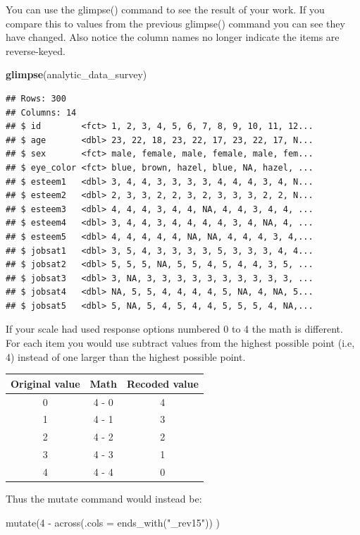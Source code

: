 \documentclass[
]{krantz}
\makeatletter
\newenvironment{Shaded}{\begin{snugshade}}{\end{snugshade}}
\newcommand{\KeywordTok}[1]{\textcolor[rgb]{0.27,0.27,0.27}{\textbf{#1}}}
\newcommand{\NormalTok}[1]{#1}
\newenvironment{kframe}{%
\medskip{}
\setlength{\fboxsep}{.8em}
 \def\at@end@of@kframe{}%
 \ifinner\ifhmode%
  \def\at@end@of@kframe{\end{minipage}}%
  \begin{minipage}{\columnwidth}%
 \fi\fi%
 \def\FrameCommand##1{\hskip\@totalleftmargin \hskip-\fboxsep
 \colorbox{shadecolor}{##1}\hskip-\fboxsep
     \hskip-\linewidth \hskip-\@totalleftmargin \hskip\columnwidth}%
 \MakeFramed {\advance\hsize-\width
   \@totalleftmargin\z@ \linewidth\hsize
   \@setminipage}}%
 {\par\unskip\endMakeFramed%
 \at@end@of@kframe}
\newenvironment{rmdblock}[1]
  {
  \begin{itemize}
  \renewcommand{\labelitemi}{
    \raisebox{-.7\height}[0pt][0pt]{
      {\setkeys{Gin}{width=3em,keepaspectratio}\texttt{[image: images/\#1]}}
    }
  }
  \setlength{\fboxsep}{1em}
  \begin{kframe}
  \item
  }
  {
  \end{kframe}
  \end{itemize}
  }
\newenvironment{rmdcaution}
  {\begin{rmdblock}{caution}}
  {\end{rmdblock}}
\renewenvironment{Shaded}{\begin{kframe}}{\end{kframe}}
\makeatother
\begin{document}
You can use the glimpse() command to see the result of your work. If you compare this to values from the previous glimpse() command you can see they have changed. Also notice the column names no longer indicate the items are reverse-keyed.

\begin{Shaded}
\begin{Highlighting}[]
\KeywordTok{glimpse}\NormalTok{(analytic_data_survey)}
\end{Highlighting}
\end{Shaded}

\begin{verbatim}
## Rows: 300
## Columns: 14
## $ id        <fct> 1, 2, 3, 4, 5, 6, 7, 8, 9, 10, 11, 12...
## $ age       <dbl> 23, 22, 18, 23, 22, 17, 23, 22, 17, N...
## $ sex       <fct> male, female, male, female, male, fem...
## $ eye_color <fct> blue, brown, hazel, blue, NA, hazel, ...
## $ esteem1   <dbl> 3, 4, 4, 3, 3, 3, 3, 4, 4, 4, 3, 4, N...
## $ esteem2   <dbl> 2, 3, 3, 2, 2, 3, 2, 3, 3, 3, 2, 2, N...
## $ esteem3   <dbl> 4, 4, 4, 3, 4, 4, NA, 4, 4, 3, 4, 4, ...
## $ esteem4   <dbl> 3, 4, 4, 3, 4, 4, 4, 4, 3, 4, NA, 4, ...
## $ esteem5   <dbl> 4, 4, 4, 4, 4, NA, NA, 4, 4, 4, 3, 4,...
## $ jobsat1   <dbl> 3, 5, 4, 3, 3, 3, 3, 5, 3, 3, 3, 4, 4...
## $ jobsat2   <dbl> 5, 5, 5, NA, 5, 5, 4, 5, 4, 4, 3, 5, ...
## $ jobsat3   <dbl> 3, NA, 3, 3, 3, 3, 3, 3, 3, 3, 3, 3, ...
## $ jobsat4   <dbl> NA, 5, 5, 4, 4, 4, 4, 5, NA, 4, NA, 5...
## $ jobsat5   <dbl> 5, NA, 5, 4, 5, 4, 4, 5, 5, 5, 4, NA,...
\end{verbatim}

\begin{rmdcaution}
\begin{rmdcaution}

If your scale had used response options numbered 0 to 4 the math is different.
For each item you would use subtract values from the highest possible point (i.e, 4) instead of one larger than the highest possible point.

\begin{longtable}[]{@{}ccc@{}}
\toprule
Original value & Math & Recoded value\tabularnewline
\midrule
\endhead
0 & 4 - 0 & 4\tabularnewline
1 & 4 - 1 & 3\tabularnewline
2 & 4 - 2 & 2\tabularnewline
3 & 4 - 3 & 1\tabularnewline
4 & 4 - 4 & 0\tabularnewline
\bottomrule
\end{longtable}

Thus the mutate command would instead be:

mutate(4 - across(.cols = ends\_with("\_rev15")) )

\end{rmdcaution}
\end{rmdcaution}
\end{document}

